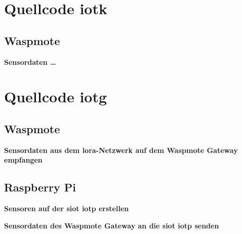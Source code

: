 \chapter{Quellcode \gls{iotk}}

\section{Waspmote}

\textbf{Sensordaten \dots}



\chapter{Quellcode \gls{iotg}}

\section{Waspmote}

\textbf{Sensordaten aus dem \gls{lora}-Netzwerk auf dem Waspmote Gateway empfangen}


\section{Raspberry Pi}\label{appendix:raspberrypi}

\textbf{Sensoren auf der \gls{siot} \gls{iotp} erstellen}


\textbf{Sensordaten des Waspmote Gateway an die \gls{siot} \gls{iotp} senden}

